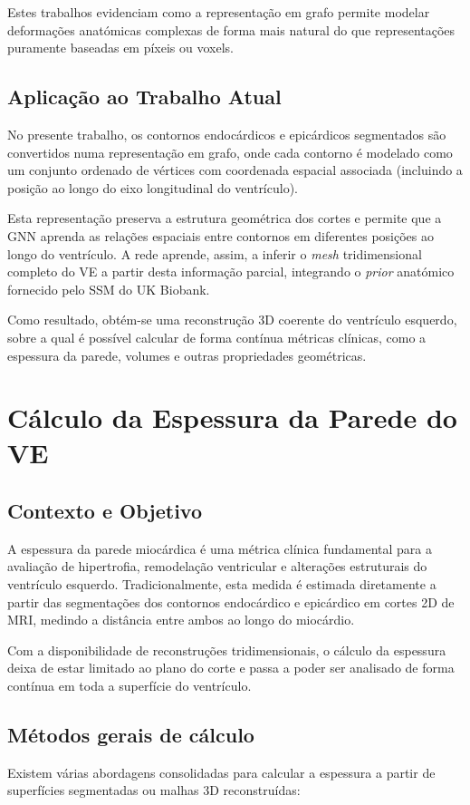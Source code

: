 \documentclass[12pt,a4paper]{report}
\begin{document}
Estes trabalhos evidenciam como a representação em grafo permite modelar deformações anatómicas complexas de forma mais natural do que representações puramente baseadas em píxeis ou voxels.

\subsection*{Aplicação ao Trabalho Atual}
No presente trabalho, os contornos endocárdicos e epicárdicos segmentados são convertidos numa representação em grafo, onde cada contorno é modelado como um conjunto ordenado de vértices com coordenada espacial associada (incluindo a posição ao longo do eixo longitudinal do ventrículo).

Esta representação preserva a estrutura geométrica dos cortes e permite que a GNN aprenda as relações espaciais entre contornos em diferentes posições ao longo do ventrículo. A rede aprende, assim, a inferir o \textit{mesh} tridimensional completo do VE a partir desta informação parcial, integrando o \textit{prior} anatómico fornecido pelo SSM do UK Biobank.

Como resultado, obtém-se uma reconstrução 3D coerente do ventrículo esquerdo, sobre a qual é possível calcular de forma contínua métricas clínicas, como a espessura da parede, volumes e outras propriedades geométricas.

\section{Cálculo da Espessura da Parede do VE}

\subsection*{Contexto e Objetivo}
A espessura da parede miocárdica é uma métrica clínica fundamental para a avaliação de hipertrofia, remodelação ventricular e alterações estruturais do ventrículo esquerdo. Tradicionalmente, esta medida é estimada diretamente a partir das segmentações dos contornos endocárdico e epicárdico em cortes 2D de MRI, medindo a distância entre ambos ao longo do miocárdio. \parencite{prasad-2009,lopez-perez-2015}

Com a disponibilidade de reconstruções tridimensionais, o cálculo da espessura deixa de estar limitado ao plano do corte e passa a poder ser analisado de forma contínua em toda a superfície do ventrículo.

\subsection*{Métodos gerais de cálculo}
Existem várias abordagens consolidadas para calcular a espessura a partir de superfícies segmentadas ou malhas 3D reconstruídas:
\end{document}
